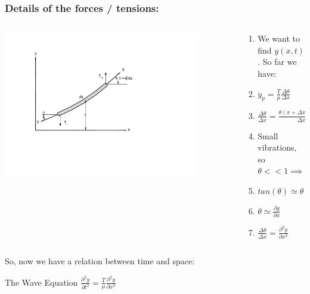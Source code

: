 \documentclass[pdf, handout, hideothersubsections]{beamer}
\begin{document}
\begin{frame}
\begin{columns}
\begin{column}{0.5\textwidth}
  \end{column}
\end{columns}
\end{frame}


\begin{frame}
\frametitle{Details of the forces / tensions:}
\begin{columns}

  \begin{column}{0.4\textwidth}
    \centering
    \includegraphics[width=0.85\textwidth]{StringForceDiagram.pdf}

  \end{column}

  \begin{column}{0.6\textwidth}
    \begin{enumerate}
    \item We want to find $y(x,t)$. So far we have:
      \pause
    \item $\ddot{y}_p = \frac{T}{\mu} \frac{\Delta \theta}{\Delta x}$
      \pause
    \item $\frac{\Delta \theta}{\Delta x} = \frac{\theta(x + \Delta x) -
        \theta{x}}{\Delta x}$
      \pause
    \item Small vibrations, so $\theta << 1 \implies$ 
      \pause
    \item $tan(\theta) \simeq \theta \implies$
      \pause
    \item $\theta \simeq \frac{\partial y}{\partial x}$
      \pause
      \item $\frac{\Delta \theta}{\Delta x} = \frac{\partial^2 y}{\partial x^2}$

    \end{enumerate}
  \end{column}
\pause
\end{columns}
So, now we have a relation between time and space:
\pause
\begin{block}{The Wave Equation}
\centering
$ \frac{\partial^2 y}{\partial t^2} = \frac{T}{\mu} \frac{\partial^2 y}{\partial x^2}$
\end{block}


\end{frame}
\end{document}
